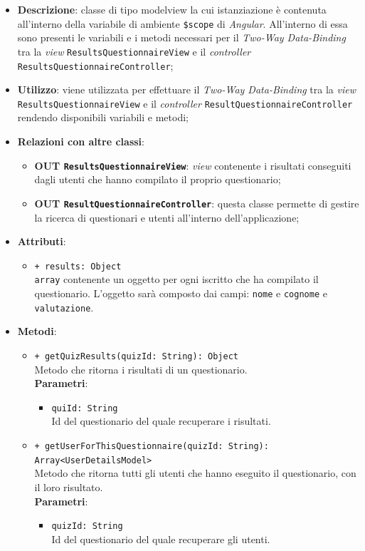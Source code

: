 	\begin{itemize}
		\item \textbf{Descrizione}: classe di tipo modelview la cui istanziazione è contenuta all'interno della variabile di ambiente \texttt{\$scope} di \textit{Angular}. All'interno di essa sono presenti le variabili e i metodi necessari per il \textit{Two-Way Data-Binding} tra la \textit{view} \texttt{ResultsQuestionnaireView} e il \textit{controller} \texttt{ResultsQuestionnaireController};
		\item \textbf{Utilizzo}: viene utilizzata per effettuare il \textit{Two-Way Data-Binding} tra la \textit{view}\\ \texttt{ResultsQuestionnaireView} e il \textit{controller} \texttt{ResultQuestionnaireController} rendendo disponibili variabili e metodi;
		\item \textbf{Relazioni con altre classi}: 
		\begin{itemize}
			\item \textbf{OUT \texttt{ResultsQuestionnaireView}}: \textit{view} contenente i risultati conseguiti dagli utenti che hanno compilato il proprio questionario; 
			\item \textbf{OUT \texttt{ResultQuestionnaireController}}: questa classe permette di gestire la ricerca di questionari e utenti all’interno dell’applicazione;
		\end{itemize}
		\item \textbf{Attributi}: 
		\begin{itemize}
				\item \texttt{+ results: Object} \\ \texttt{array} contenente un oggetto per ogni iscritto che ha compilato il questionario. L'oggetto sarà composto dai campi: \texttt{nome} e \texttt{cognome} e \texttt{valutazione}.
		\end{itemize}
		\item \textbf{Metodi}: 
		\begin{itemize}
			\item \texttt{+ getQuizResults(quizId: String): Object} \\ Metodo che ritorna i risultati di un questionario.\\
			\textbf{Parametri}:
			\begin{itemize}
				\item \texttt{quiId: String} \\ 
				Id del questionario del quale recuperare i risultati.
			\end{itemize}
			\item \texttt{+ getUserForThisQuestionnaire(quizId: String): Array<UserDetailsModel>} \\ Metodo che ritorna tutti gli utenti che hanno eseguito il questionario, con il loro risultato.\\
			\textbf{Parametri}:
			\begin{itemize}
				\item \texttt{quizId: String} \\ Id del questionario del quale recuperare gli utenti.
			\end{itemize}
				
		\end{itemize}
	\end{itemize}

	